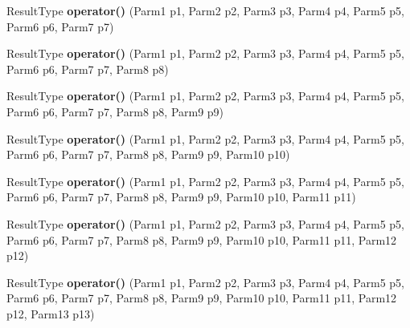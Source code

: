 \begin{DoxyCompactItemize}
\item 
\hypertarget{classLoki_1_1FunctorHandler_acc95186020d2beaf5d2cb6484b3d452e}{}Result\+Type {\bfseries operator()} (Parm1 p1, Parm2 p2, Parm3 p3, Parm4 p4, Parm5 p5, Parm6 p6, Parm7 p7)\label{classLoki_1_1FunctorHandler_acc95186020d2beaf5d2cb6484b3d452e}

\item 
\hypertarget{classLoki_1_1FunctorHandler_a6ec2f726a3f271fadd890e5b5f6c0c25}{}Result\+Type {\bfseries operator()} (Parm1 p1, Parm2 p2, Parm3 p3, Parm4 p4, Parm5 p5, Parm6 p6, Parm7 p7, Parm8 p8)\label{classLoki_1_1FunctorHandler_a6ec2f726a3f271fadd890e5b5f6c0c25}

\item 
\hypertarget{classLoki_1_1FunctorHandler_ac49d1b9f47e42bb6e828c16ec0bcddec}{}Result\+Type {\bfseries operator()} (Parm1 p1, Parm2 p2, Parm3 p3, Parm4 p4, Parm5 p5, Parm6 p6, Parm7 p7, Parm8 p8, Parm9 p9)\label{classLoki_1_1FunctorHandler_ac49d1b9f47e42bb6e828c16ec0bcddec}

\item 
\hypertarget{classLoki_1_1FunctorHandler_a33abf5623a2add7804755faa1bcde20b}{}Result\+Type {\bfseries operator()} (Parm1 p1, Parm2 p2, Parm3 p3, Parm4 p4, Parm5 p5, Parm6 p6, Parm7 p7, Parm8 p8, Parm9 p9, Parm10 p10)\label{classLoki_1_1FunctorHandler_a33abf5623a2add7804755faa1bcde20b}

\item 
\hypertarget{classLoki_1_1FunctorHandler_aa55004cc16af47f15cce1cd8b5cafc3d}{}Result\+Type {\bfseries operator()} (Parm1 p1, Parm2 p2, Parm3 p3, Parm4 p4, Parm5 p5, Parm6 p6, Parm7 p7, Parm8 p8, Parm9 p9, Parm10 p10, Parm11 p11)\label{classLoki_1_1FunctorHandler_aa55004cc16af47f15cce1cd8b5cafc3d}

\item 
\hypertarget{classLoki_1_1FunctorHandler_aa35dbe3c8f8de11a5d1d2d03a84f7b19}{}Result\+Type {\bfseries operator()} (Parm1 p1, Parm2 p2, Parm3 p3, Parm4 p4, Parm5 p5, Parm6 p6, Parm7 p7, Parm8 p8, Parm9 p9, Parm10 p10, Parm11 p11, Parm12 p12)\label{classLoki_1_1FunctorHandler_aa35dbe3c8f8de11a5d1d2d03a84f7b19}

\item 
\hypertarget{classLoki_1_1FunctorHandler_aeed756559633e86735c68fb3033684b7}{}Result\+Type {\bfseries operator()} (Parm1 p1, Parm2 p2, Parm3 p3, Parm4 p4, Parm5 p5, Parm6 p6, Parm7 p7, Parm8 p8, Parm9 p9, Parm10 p10, Parm11 p11, Parm12 p12, Parm13 p13)\label{classLoki_1_1FunctorHandler_aeed756559633e86735c68fb3033684b7}


\end{DoxyCompactItemize}

